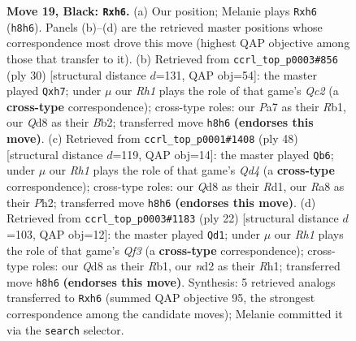 \documentclass[11pt]{article}
\begin{document}
\begin{figure}[p]
\caption{\textbf{Move 19, Black: \texttt{Rxh6}.} (a) Our position; Melanie plays \texttt{Rxh6} (\texttt{h8h6}). Panels (b)--(d) are the retrieved master positions whose correspondence most drove this move (highest QAP objective among those that transfer to it). (b) Retrieved from \texttt{ccrl\_top\_p0003\#856} (ply 30) [structural distance $d$=131, QAP obj=54]: the master played \texttt{Qxh7}; under $\mu$ our \emph{Rh1} plays the role of that game's \emph{Qc2} (a \textbf{cross-type} correspondence); cross-type roles: our \emph{P}a7 as their \emph{R}b1, our \emph{Q}d8 as their \emph{B}b2; transferred move \texttt{h8h6} \textbf{(endorses this move)}. (c) Retrieved from \texttt{ccrl\_top\_p0001\#1408} (ply 48) [structural distance $d$=119, QAP obj=14]: the master played \texttt{Qb6}; under $\mu$ our \emph{Rh1} plays the role of that game's \emph{Qd4} (a \textbf{cross-type} correspondence); cross-type roles: our \emph{Q}d8 as their \emph{R}d1, our \emph{R}a8 as their \emph{P}h2; transferred move \texttt{h8h6} \textbf{(endorses this move)}. (d) Retrieved from \texttt{ccrl\_top\_p0003\#1183} (ply 22) [structural distance $d$=103, QAP obj=12]: the master played \texttt{Qd1}; under $\mu$ our \emph{Rh1} plays the role of that game's \emph{Qf3} (a \textbf{cross-type} correspondence); cross-type roles: our \emph{Q}d8 as their \emph{R}b1, our \emph{n}d2 as their \emph{R}h1; transferred move \texttt{h8h6} \textbf{(endorses this move)}. Synthesis: 5 retrieved analogs transferred to \texttt{Rxh6} (summed QAP objective 95, the strongest correspondence among the candidate moves); Melanie committed it via the \texttt{search} selector.}
\label{fig:thought-m37}
\end{figure}

\clearpage
\end{document}

